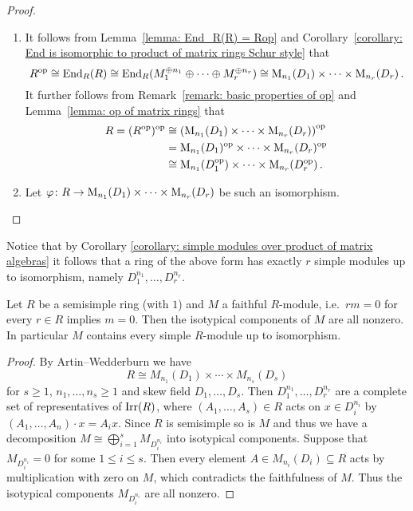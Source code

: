 \begin{proof}
  \leavevmode
  \begin{enumerate}
    \item
      It follows from Lemma~\ref{lemma: End_R(R) = Rop} and Corollary~\ref{corollary: End is isomorphic to product of matrix rings Schur style} that
      \[
                R^{\mathrm{op}}
        \cong   \operatorname{End}_R(R)
        \cong   \operatorname{End}_R(M_1^{\oplus n_1} \oplus \dotsb \oplus M_r^{\oplus n_r})
        \cong   \operatorname{M}_{n_1}(D_1) \times \dotsb \times \operatorname{M}_{n_r}(D_r) \,.
      \]
      It further follows from Remark~\ref{remark: basic properties of op} and Lemma~\ref{lemma: op of matrix rings} that
      \begin{align*}
                R
        =      (R^{\mathrm{op}})^{\mathrm{op}}
        &\cong  \left( \operatorname{M}_{n_1}(D_1) \times \dotsb \times \operatorname{M}_{n_r}(D_r) \right)^{\mathrm{op}} \\
        &=      \operatorname{M}_{n_1}(D_1)^{\mathrm{op}} \times \dotsb \times \operatorname{M}_{n_r}(D_r)^{\mathrm{op}}  \\
        &\cong  \operatorname{M}_{n_1}(D_1^{\mathrm{op}}) \times \dotsb \times \operatorname{M}_{n_r}(D_r^{\mathrm{op}}) \,.
      \end{align*}
    \item
      Let $\varphi \colon R \to \operatorname{M}_{n_1}(D_1) \times \dotsb \times \operatorname{M}_{n_r}(D_r)$ be such an isomorphism.
      
  \end{enumerate}
\end{proof}



Notice that by Corollary \ref{corollary: simple modules over product of matrix algebras} it follows that a ring of the above form has exactly $r$ simple modules up to isomorphism, namely $D_1^{n_1}, \dotsc, D_r^{n_r}$.


\begin{corollary}
  Let $R$ be a semisimple ring (with $1$) and $M$ a faithful $R$-module, i.e.\ $rm = 0$ for every $r \in R$ implies $m = 0$.
  Then the isotypical components of $M$ are all nonzero.
  In particular $M$ contains every simple $R$-module up to isomorphism.
\end{corollary}
\begin{proof}
  By Artin--Wedderburn we have
  \[
    R \cong M_{n_1}(D_1) \times \dotsb \times M_{n_s}(D_s)
  \]
  for $s \geq 1$, $n_1, \dotsc, n_s \geq 1$ and skew field $D_1, \dotsc, D_s$.
  Then $D_1^{n_1}, \dotsc, D_r^{n_r}$ are a complete set of representatives of $\operatorname{Irr}(R)$, where $(A_1, \dotsc, A_s) \in R$ acts on $x \in D_i^{n_i}$ by $(A_1, \dotsc, A_n) \cdot x = A_i x$.
  Since $R$ is semisimple so is $M$ and thus we have a decomposition $M \cong \bigoplus_{i=1}^s M_{D_i^{n_i}}$ into isotypical components.
  Suppose that $M_{D_i^{n_i}} = 0$ for some $1 \leq i \leq s$.
  Then every element $A \in M_{n_i}(D_i) \subseteq R$ acts by multiplication with zero on $M$, which contradicts the faithfulness of $M$.
  Thus the isotypical components $M_{D_i^{n_i}}$ are all nonzero.
\end{proof}




